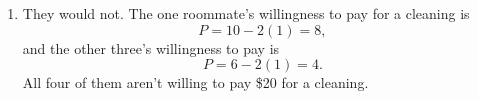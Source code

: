 \documentclass{article}
\begin{document}
\begin{enumerate}
\begin{enumerate}
	\item They would not. The one roommate's willingness to pay for a cleaning is
		\begin{equation*}
		P = 10 - 2(1) = 8,
		\end{equation*}
		and the other three's willingness to pay is
		\begin{equation*}
		P = 6 - 2(1) = 4.
		\end{equation*}
		All four of them aren't willing to pay \$20 for a cleaning.
	
	\end{enumerate}

\end{enumerate}
\end{document}
